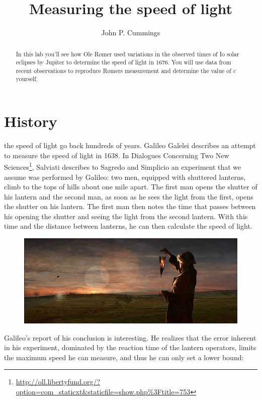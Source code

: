 \documentclass{tufte-handout}
\title{Measuring the speed of light}
\author[John P. Cummings]{John P. Cummings}
\begin{document}
\maketitle%

\begin{abstract}
\noindent In this lab you'll see how Ole R{\o}mer used variations in the observed times of Io solar eclipses by Jupiter to determine the speed of light in 1676.  You will use data from recent observations to reproduce R{\o}mers measurement and determine the value of $c$ yourself.
\end{abstract}


\section{History}
 the speed of light go back hundreds of years.  Galileo Galelei describes an attempt to measure the speed of light in 1638.  In Dialogues Concerning Two New Sciences\footnote{\url{http://oll.libertyfund.org/?option=com_staticxt&staticfile=show.php\%3Ftitle=753}}, Salviati describes to Sagredo and Simplicio an experiment that we assume was performed by Galileo:  two men, equipped with shuttered lanterns, climb to the tops of hills about one mile apart.  The first man opens the shutter of his lantern and the second man, as soon as he sees the light from the first, opens the shutter on his lantern.  The first man then notes the time that passes between his opening the shutter and seeing the light from the second lantern.   With this time and the distance between lanterns, he can then calculate the speed of light.  
\begin{figure}
\includegraphics{galileo_beacon_of_gondor.jpg}
\end{figure}

Galileo's report of his conclusion is interesting.  He realizes that the error inherent in his experiment, dominated by the reaction time of the lantern operators, limits the maximum speed he can measure, and thus he can only set a lower bound:
\end{document}
